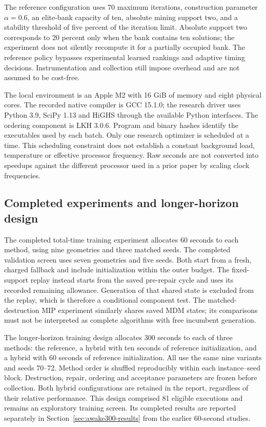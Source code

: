The reference configuration uses 70 maximum iterations, construction
parameter $\alpha=0.6$, an elite-bank capacity of ten, absolute mining support
two, and a stability threshold of five percent of the iteration limit.
Absolute support two corresponds to 20 percent only when the bank contains
ten solutions; the experiment does not silently recompute it for a partially
occupied bank. The reference policy bypasses experimental learned rankings
and adaptive timing decisions. Instrumentation and collection still impose
overhead and are not assumed to be cost-free.

The local environment is an Apple M2 with 16 GiB of memory and eight physical
cores. The recorded native compiler is GCC 15.1.0; the research driver uses
Python 3.9, SciPy 1.13 and HiGHS through the available Python interfaces.
The ordering component is LKH 3.0.6. Program and binary hashes identify the
executables used by each batch. Only one research optimizer is scheduled at
a time. This scheduling constraint does not establish a constant background
load, temperature or effective processor frequency. Raw seconds are not
converted into speedups against the different processor used in a prior
paper by scaling clock frequencies.

\subsection{Completed experiments and longer-horizon design}
The completed total-time training experiment allocates 60 seconds to each
method, using nine geometries and three matched seeds. The completed
validation screen uses seven geometries and five seeds. Both start from a
fresh, charged fallback and include initialization within the outer budget.
The fixed-support replay instead starts from the saved pre-repair cycle and
uses its recorded remaining allowance. Generation of that shared state is
excluded from the replay, which is therefore a conditional component test.
The matched-destruction MIP experiment similarly shares saved MDM states;
its comparisons must not be interpreted as complete algorithms with free
incumbent generation.

The longer-horizon training design allocates 300 seconds to each of three
methods: the reference, a hybrid with ten seconds of reference initialization,
and a hybrid with 60 seconds of reference initialization. All use the same
nine variants and seeds 70--72. Method order is shuffled reproducibly within
each instance--seed block. Destruction, repair, ordering and acceptance
parameters are frozen before collection. Both hybrid configurations are
retained in the report, regardless of their relative performance. This
design comprised 81 eligible executions and remains an exploratory training
screen. Its completed results are reported separately in
Section~\ref{sec:awake300-results} from the earlier 60-second studies.

